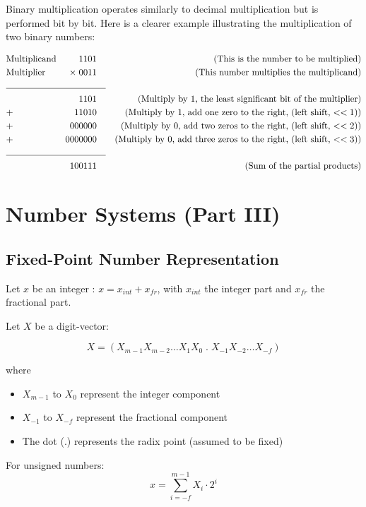 \documentclass[12pt,openany, tikz,border=10pt]{book}
\begin{document}
		  
		
		\newpage
		Binary multiplication operates similarly to decimal multiplication but is performed bit by bit. Here is a clearer example illustrating the multiplication of two binary numbers:
		
		\begin{align*}
			  & \text{Multiplicand} & 1101           & \quad & \text{(This is the number to be multiplied)}                              \\
			  & \text{Multiplier}   & \times \; 0011 &       & \text{(This number multiplies the multiplicand)}                          \\
			\cline{2-4}
			  &                     & 1101           &       & \text{(Multiply by 1, the least significant bit of the multiplier)}       \\
			  & +                   & 11010          &       & \text{(Multiply by 1, add one zero to the right, (left shift, $<<1$))}    \\
			  & +                   & 000000         &       & \text{(Multiply by 0, add two zeros to the right, (left shift, $<<2$))}   \\
			  & +                   & 0000000        &       & \text{(Multiply by 0, add three zeros to the right, (left shift, $<<3$))} \\
			\cline{2-4}
			  &                     & 100111         &       & \text{(Sum of the partial products)}                                      
		\end{align*}
		
		
		
		
		\chapter{Number Systems (Part III)}
		\section{Fixed-Point
		Number Representation}  
		
		Let \(x\) be an integer :
		$x  = x_{int} + x_{fr}$, with $x_{int}$ the integer part and $x_{fr}$ the fractional part.
		
		Let \( X \) be a digit-vector:
		
		\[ X = (X_{m-1} X_{m-2} \dots X_1 X_0 \; . \;  X_{-1} X_{-2} \dots X_{-f}) \]
		
		where
		\begin{itemize}
			\item[] \( X_{m-1} \) to \( X_0 \) represent the integer component
			\item[] \( X_{-1} \) to \( X_{-f} \) represent the fractional component
			\item[] The dot (.) represents the radix point (assumed to be fixed)
		\end{itemize}
		\vskip 0.5cm
		For unsigned numbers:
		\[ x = \sum_{i=-f}^{m-1} X_i \cdot 2^i \]
		
\end{document}
